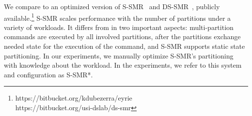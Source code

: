 We compare \dynastar{} to an optimized version of S-SMR~\cite{bezerra2014ssmr}
and DS-SMR~\cite{le2016dssmr}, publicly
available.\footnote{https://bitbucket.org/kdubezerra/eyrie\\
https://bitbucket.org/usi-dslab/ds-smr} S-SMR scales performance with the number
of partitions under a variety of workloads. It differs from \dynastar{} in two
important aspects: multi-partition commands are executed by all involved
partitions, after the partitions exchange needed state for the execution of the
command, and S-SMR supports static state partitioning. In our experiments, we
manually optimize S-SMR's partitioning with knowledge about the workload. In the
experiments, we refer to this system and configuration as S-SMR*.

